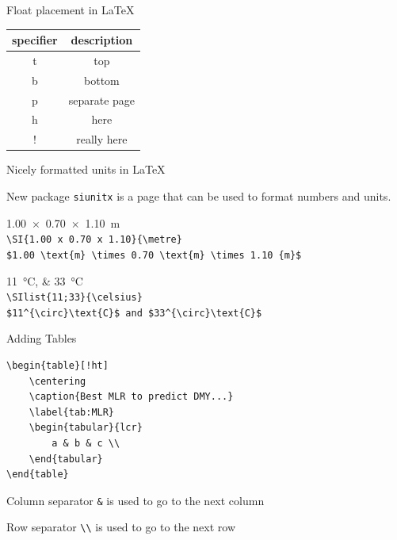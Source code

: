 \documentclass[final,aspectratio=43]{beamer}
\begin{document}
\begin{frame}{Float placement in \LaTeX}
    \centering
    \begin{tabular}{cc}
        specifier & description \\
        \hline
        t & top\\
        b & bottom\\
        p & separate page\\
        h & here\\
        ! & really here \\

    \end{tabular}
\end{frame}

\begin{frame}{Nicely formatted units in \LaTeX}
    \begin{block}{New package}
        \texttt{siunitx} is a page that can be used to format numbers and units.
    \end{block}

    \SI{1.00 x 0.70 x 1.10}{\metre}\\
    \texttt{\textbackslash SI\{1.00 x 0.70 x 1.10\}\{\textbackslash metre\}}\\
    \texttt{\$1.00 \textbackslash text\{m\} \textbackslash times 0.70 \textbackslash text\{m\} \textbackslash times 1.10 \text\{m\}\$}
    
    \SIlist{11;33}{\celsius}\\
    \texttt{\textbackslash SIlist\{11;33\}\{\textbackslash celsius\}}\\
    \texttt{\$11\^{}\{\textbackslash circ\}\textbackslash text\{C\}\$ and \$33\^{}\{\textbackslash circ\}\textbackslash text\{C\}\$}
\end{frame}

\begin{frame}[fragile]{Adding Tables}
    \begin{lstlisting}[basicstyle=\ttfamily\small]
\begin{table}[!ht]
    \centering
    \caption{Best MLR to predict DMY...}
    \label{tab:MLR}
    \begin{tabular}{lcr}
        a & b & c \\
    \end{tabular}
\end{table}
    \end{lstlisting}
    
    \begin{block}{Column separator}
        \texttt{\&} is used to go to the next column
    \end{block}
    
    \begin{block}{Row separator}
        \texttt{\textbackslash\textbackslash} is used to go to the next row
    \end{block}
\end{frame}
\end{document}
